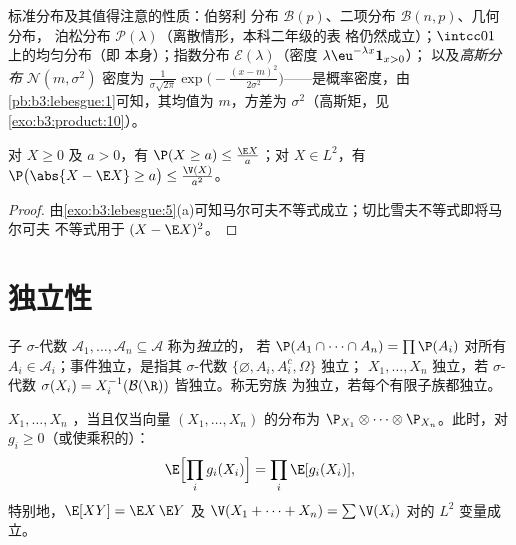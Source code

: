 \begin{example}\label{ex:b3:probability:laws}
标准分布及其值得注意的性质：伯努利
分布 $\mathcal B(p)$、二项分布 $\mathcal B(n, p)$、几何分布，
泊松分布 $\mathcal P(\lambda)$（离散情形，本科二年级的表
格仍然成立）；$\intcc01$ 上的均匀分布（即
本身）；指数分布 $\mathcal E(\lambda)$（密度
$\lambda\eu^{-\lambda x}\mathbf 1_{x>0}$）；
以及\emph{高斯分布} $\mathcal N(m, \sigma^2)$
密度为 $\frac1{\sigma\sqrt{2\pi}}\exp\bigl(-\frac{(x -
m)^2}{2\sigma^2}\bigr)$——是概率密度，由
\cref{pb:b3:lebesgue:1}可知，其均值为 $m$，方差为
$\sigma^2$（高斯矩，见\cref{exo:b3:product:10}）。
\end{example}

\begin{proposition}[马尔可夫与切比雪夫]
\label{prop:b3:probability:markov}
对 $X \geq 0$ 及 $a > 0$，有 $\P(X \geq a) \leq \frac{\E
X}{a}$；对 $X \in L^2$，有 $\P\bigl(\abs{X - \E X} \geq
a\bigr) \leq \frac{\V(X)}{a^2}$。
\end{proposition}

\begin{proof}
由\cref{exo:b3:lebesgue:5}(a)可知马尔可夫不等式成立；切比雪夫不等式即将马尔可夫
不等式用于 $(X - \E X)^2$。
\end{proof}

\section{独立性}

\begin{definition}\label{def:b3:probability:independence}
子 $\sigma$-代数 $\mathcal A_1, \dots, \mathcal A_n
\subseteq \mathcal A$ 称为\emph{独立}的，
若 $\P(A_1\cap\dots\cap A_n) = \prod\P(A_i)$ 对所有 $A_i \in
\mathcal A_i$；事件独立，是指其 $\sigma$-代数
$\{\varnothing, A_i, A_i^c, \Omega\}$ 独立；
$X_1, \dots, X_n$ 独立，若 $\sigma$-代数 $\sigma(X_i) =
X_i^{-1}(\mathcal B(\R))$ 皆独立。称无穷族
为独立，若每个有限子族都独立。
\end{definition}

\begin{theorem}\label{thm:b3:probability:independence}
$X_1, \dots, X_n$ ，当且仅当向量
$(X_1, \dots, X_n)$ 的分布为
$\P_{X_1}\otimes\cdots\otimes\P_{X_n}$。此时，对
$g_i \geq 0$（或使乘积的）：
\[
\E\Bigl[\prod_ig_i(X_i)\Bigr] = \prod_i\E[g_i(X_i)],
\]
特别地，$\E[XY] = \E X\,\E Y$ 及 $\V(X_1 + \dots +
X_n) = \sum\V(X_i)$ 对的 $L^2$ 变量成立。
\end{theorem}


